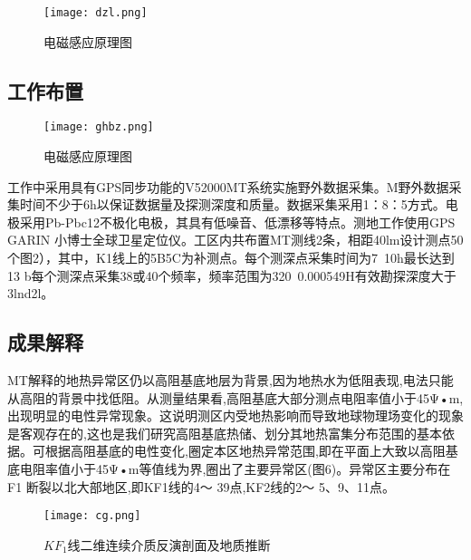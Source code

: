 \documentclass[lang=cn,11pt]{elegantpaper}
\begin{document}
     \begin{figure}[htbp]
	\centering
	\texttt{[image: dzl.png]}
    \caption{电磁感应原理图 \label{fig:scatter}}
    \end{figure}

     \subsection{工作布置}

     \begin{figure}[htbp]
	\centering
	\texttt{[image: ghbz.png]}
     \caption{电磁感应原理图 \label{fig:scatter}}
    \end{figure}

     工作中采用具有GPS同步功能的V52000MT系统实施野外数据采集。M野外数据采集时间不少于6h以保证数据量及探测深度和质量。数据采集采用1：8：5方式。电极采用Pb-Pbc12不极化电极，其具有低噪音、低漂移等特点。测地工作使用GPS GARIN 小博士全球卫星定位仪。工区内共布置MT测线2条，相距40lm设计测点50个图2），其中，K1线上的5B5C为补测点。每个测深点采集时间为7~10h最长达到13
     b每个测深点采集38或40个频率，频率范围为320~0.000549H有效勘探深度大于3lnd2l。

     \subsection{成果解释}
     MT解释的地热异常区仍以高阻基底地层为背景,因为地热水为低阻表现,电法只能从高阻的背景中找低阻。从测量结果看,高阻基底大部分测点电阻率值小于45Ψ•m,出现明显的电性异常现象。这说明测区内受地热影响而导致地球物理场变化的现象是客观存在的,这也是我们研究高阻基底热储、划分其地热富集分布范围的基本依据。可根据高阻基底的电性变化,圈定本区地热异常范围,即在平面上大致以高阻基底电阻率值小于45Ψ•m等值线为界,圈出了主要异常区(图6)。异常区主要分布在F1 断裂以北大部地区,即KF1线的4～ 39点,KF2线的2～ 5、9、11点。

      \begin{figure}[htbp]
	\centering
	\texttt{[image: cg.png]}
    \caption{$KF_1$线二维连续介质反演剖面及地质推断 \label{fig:scatter}}
    \end{figure}
\end{document}
